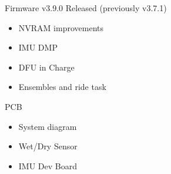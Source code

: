 \begin{frame}{Firmware}
    v3.9.0 Released (previously v3.7.1)
    \begin{itemize}
      \item NVRAM improvements
      \item IMU DMP
      \item DFU in Charge
      \item Ensembles and ride task
    \end{itemize}
\end{frame}

\begin{frame}{PCB}
  \begin{itemize}
    \item System diagram
    \item Wet/Dry Sensor
    \item IMU Dev Board
  \end{itemize}
\end{frame}




